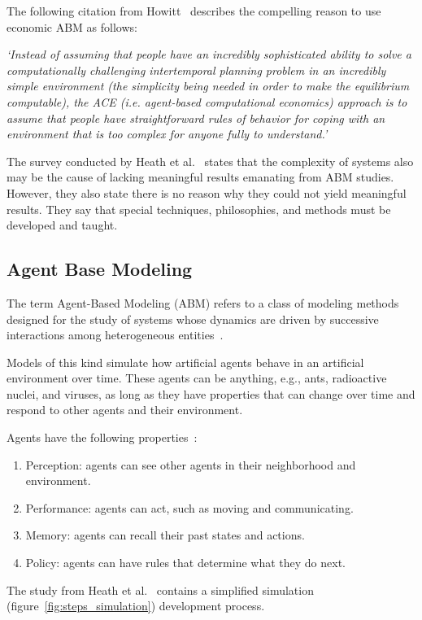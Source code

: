 The following citation from Howitt~\cite{howitt2012have} describes the compelling reason to use economic ABM as follows:

\textit{`Instead of assuming that people have an incredibly sophisticated ability to solve a computationally challenging intertemporal planning problem in an incredibly simple environment (the simplicity being needed in order to make the equilibrium computable), the ACE (i.e.
agent-based computational economics) approach is to assume that people have straightforward rules of behavior for coping with an environment that is too complex for anyone fully to understand.'}

The survey conducted by Heath et al.~\cite{heath2009survey} states that the complexity of systems also may be the cause of lacking meaningful results emanating from ABM studies.
However, they also state there is no reason why they could not yield meaningful results.
They say that special techniques, philosophies, and methods must be developed and taught.

\subsection{Agent Base Modeling}\label{subsec:agent-base-modeling}
The term Agent-Based Modeling (ABM) refers to a class of modeling methods designed for the study of systems whose dynamics are driven by successive interactions among heterogeneous entities~\cite{tesfatsion2023agent}.

Models of this kind simulate how artificial agents behave in an artificial environment over time.
These agents can be anything, e.g., ants, radioactive nuclei, and viruses, as long as they have properties that can change over time and respond to other agents and their environment.

Agents have the following properties~\cite{hamill2016agent}:
\begin{enumerate}
  \item Perception: agents can see other agents in their neighborhood and environment.
  \item Performance: agents can act, such as moving and communicating.
  \item Memory: agents can recall their past states and actions.
  \item Policy: agents can have rules that determine what they do next.
\end{enumerate}

The study from Heath et al.~\cite{heath2009survey} contains a simplified simulation (figure~\ref{fig:steps_simulation}) development process.

